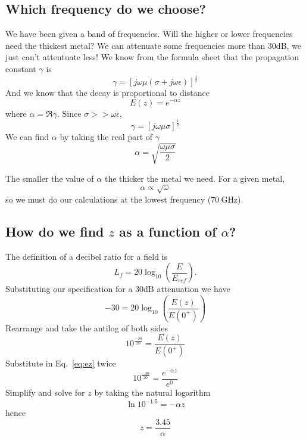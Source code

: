 \documentclass{tufte-handout}
\begin{document}
\subsection{Which frequency do we choose?}
We have been given a band of frequencies. Will the higher or lower frequencies need the thickest metal? We can attenuate some frequencies more than 30dB, we just can't attentuate less! 
We know from the formula sheet that the propagation constant $\gamma$ is 
\begin{equation}
\gamma = \left[j\omega\mu\left(\sigma+j\omega\epsilon \right)\right]^{\frac{1}{2}}
\end{equation}
And we know that the decay is proportional to distance 
\begin{equation}
E(z) = e^{-\alpha z}
\label{eq:ez}
\end{equation}
where $\alpha = \Re{\gamma}$. Since $\sigma >> \omega\epsilon$,
\begin{equation}
\gamma = \left[j\omega\mu\sigma\right]^{\frac{1}{2}}
\end{equation}
We can find $\alpha$ by taking the real part\marginnote{\[\sqrt{j}=\frac{1+j}{\sqrt{2}}\]} of $\gamma$
\begin{equation}
\boxed{\alpha = \sqrt{\frac{\omega\mu\sigma}{2}}}
\end{equation}

 The smaller the value of $\alpha$ the thicker the metal we need. For a given metal,
 \begin{equation}
 \alpha \propto \sqrt{\omega}
 \end{equation}
so we must do our calculations at the lowest frequency ($\SI{70}{\giga\hertz}$).

\subsection{How do we find $z$ as a function of $\alpha$?}

The definition of a decibel ratio for a field is
\begin{equation}
L_f = 20\log_{10}\left(\frac{E}{E_{ref}}\right).
\end{equation}
Substituting our specification for a 30dB attenuation we have
\begin{equation}
-30 = 20\log_{10}\left(\frac{E(z)}{E(0^+)}\right)
\end{equation}
Rearrange and take the antilog of both sides
\begin{equation}
10^\frac{-30}{20} = \frac{E(z)}{E(0^+)}
\end{equation}
Substitute in Eq.~\ref{eq:ez} twice
\begin{equation}
10^\frac{-30}{20} = \frac{e^{-\alpha z}}{e^0}
\end{equation}
Simplify and solve for $z$ by taking the natural logarithm
\begin{equation}
\ln{10^{-1.5}} = -\alpha z
\end{equation}
hence
\begin{equation}
\boxed{z = \frac{3.45}{\alpha}}
\end{equation}
\end{document}
